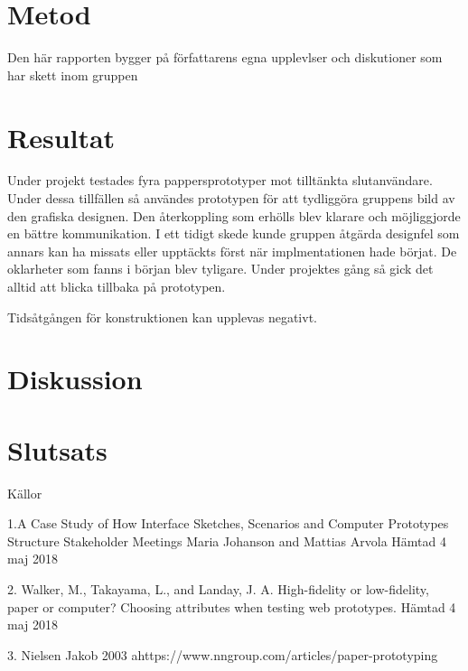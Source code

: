 \section{Metod}
Den här rapporten bygger på författarens egna upplevlser och diskutioner som har skett inom gruppen 

\section{Resultat}
Under projekt testades fyra pappersprototyper mot tilltänkta slutanvändare. Under dessa tillfällen så användes prototypen för att tydliggöra gruppens bild av den grafiska designen. Den återkoppling som erhölls blev klarare och möjliggjorde en bättre kommunikation. I ett tidigt skede kunde gruppen åtgärda designfel som annars kan ha missats eller upptäckts först när implmentationen hade börjat. De oklarheter som fanns i början blev tyligare. Under projektes gång så gick det alltid att blicka tillbaka på prototypen. 

Tidsåtgången för konstruktionen kan upplevas negativt.  

\section{Diskussion}

\section{Slutsats}

Källor

1.A Case Study of How Interface Sketches, Scenarios and Computer Prototypes Structure Stakeholder Meetings Maria Johanson and Mattias Arvola Hämtad 4 maj 2018  

2. Walker, M., Takayama, L., and Landay, J. A. High-fidelity or low-fidelity, paper or computer? Choosing attributes when testing web prototypes. Hämtad 4 maj 2018  

3. Nielsen Jakob 2003 
ahttps://www.nngroup.com/articles/paper-prototyping 